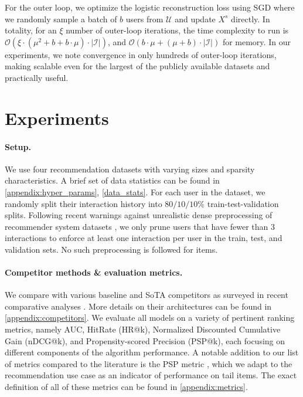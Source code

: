\documentclass{article}
\begin{document}
For the outer loop, we optimize the logistic reconstruction loss using SGD where we randomly sample a batch of $b$ users from $\mathcal{U}$ and update $X^s$ directly. In totality, for an $\xi$ number of outer-loop iterations, the time complexity to run \sampler is $\mathcal{O}(\xi \cdot (\mu^{2} + b + b \cdot \mu) \cdot |\mathcal{I}|)$, and $\mathcal{O}(b \cdot \mu + (\mu + b) \cdot |\mathcal{I}|)$ for memory. In our experiments, we note convergence in only hundreds of outer-loop iterations, making \sampler scalable even for the largest of the publicly available datasets and practically useful.

\section{Experiments} \label{sec:experiments}

\paragraph{Setup.} We use four recommendation datasets with varying sizes and sparsity characteristics. A brief set of data statistics can be found in \cref{appendix:hyper_params}, \cref{data_stats}. 
For each user in the dataset, we randomly split their interaction history into $80/10/10$\% train-test-validation splits. Following recent warnings against unrealistic dense preprocessing of recommender system datasets \cite{sigir20, wsdm22}, we only prune users that have fewer than $3$ interactions to enforce at least one interaction per user in the train, test, and validation sets. No such preprocessing is followed for items. 


\paragraph{Competitor methods \& evaluation metrics.} We compare \model with various baseline and SoTA competitors as surveyed in recent comparative analyses \cite{recsys_sota_quest, making_progress}. More details on their architectures can be found in \cref{appendix:competitors}. We evaluate all models on a variety of pertinent ranking metrics, namely AUC, HitRate (HR@k), Normalized Discounted Cumulative Gain (nDCG@k), and Propensity-scored Precision (PSP@k), each focusing on different components of the algorithm performance. A notable addition to our list of metrics compared to the literature is the PSP metric \cite{pfastre}, which we adapt to the recommendation use case as an indicator of performance on tail items. The exact definition of all of these metrics can be found in \cref{appendix:metrics}.
\end{document}
